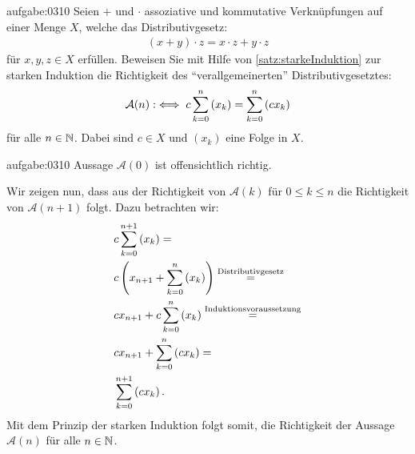 \begin{aufgabe}{aufgabe:0310}
Seien $+$ und $\cdot$ assoziative und kommutative Verknüpfungen auf einer Menge $X$, welche das Distributivgesetz:
\begin{align*}
    (x+y)\cdot z = x\cdot z + y\cdot z
\end{align*}
für $x,y,z\in X$ erfüllen. Beweisen Sie mit Hilfe von \cref{satz:starkeInduktion} zur starken Induktion die Richtigkeit des \enquote{verallgemeinerten} Distributivgesetztes:
\begin{align*}
    \mathcal{A}(n) :\iff c\sum_{k=0}^n\left(x_k\right) = \sum_{k=0}^n\left(cx_k\right)
\end{align*}
für alle $n\in\mathbb{N}$. Dabei sind $c\in X$ und $(x_k)$ eine Folge in $X$. 
\end{aufgabe}
\begin{antwort}{aufgabe:0310}
Aussage $\mathcal{A}(0)$ ist offensichtlich richtig.

Wir zeigen nun, dass aus der Richtigkeit von $\mathcal{A}(k)$ für $0\leq k\leq n$ die Richtigkeit von $\mathcal{A}(n+1)$ folgt. Dazu betrachten wir:
\begin{align*}
    &c\sum_{k=0}^{n+1}\left(x_k\right) = \\
    &c\left(x_{n+1} + \sum_{k=0}^{n}\left(x_k\right)\right) \stackrel{\text{Distributivgesetz}}{=} \\
    &cx_{n+1} + c\sum_{k=0}^{n}\left(x_k\right) \stackrel{\text{Induktionsvoraussetzung}}{=} \\
    &cx_{n+1} + \sum_{k=0}^{n}\left(cx_k\right) = \\
    &\sum_{k=0}^{n+1}\left(cx_k\right).
\end{align*}
Mit dem Prinzip der starken Induktion folgt somit, die Richtigkeit der Aussage $\mathcal{A}(n)$ für alle $n\in\mathbb{N}$.
\end{antwort}

\clearpage
\shipoutAnswer
